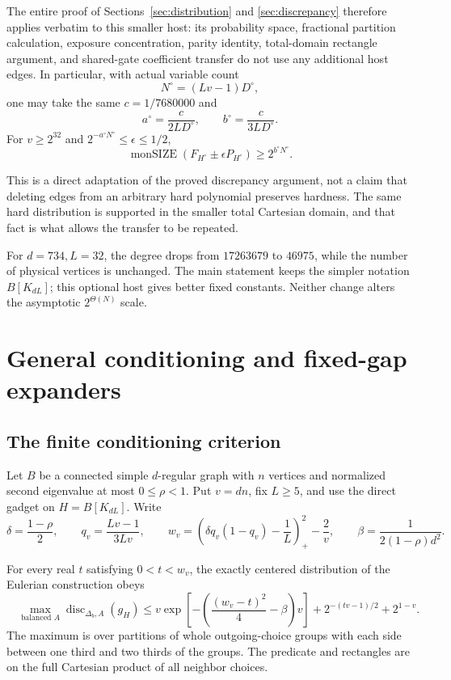 \documentclass[11pt]{article}
\theoremstyle{definition}
\theoremstyle{remark}
\numberwithin{equation}{section}
\begin{document}
The entire proof of Sections~\ref{sec:distribution} and \ref{sec:discrepancy} therefore applies
verbatim to this smaller host: its probability space, fractional
partition calculation, exposure concentration, parity identity,
total-domain rectangle argument, and shared-gate coefficient
transfer do not use any additional host edges. In particular,
with actual variable count
\[
                 N^\circ=(Lv-1)D^\circ,
\]
one may take the same \(c=1/7680000\) and
\[
 a^\circ=\frac{c}{2LD^\circ},\qquad
 b^\circ=\frac{c}{3LD^\circ}.
\]
For \(v\ge2^{32}\) and
\(2^{-a^\circ N^\circ}\le\epsilon\le1/2\),
\[
 \operatorname{monSIZE}
       (F_{H^\circ}\pm\epsilon P_{H^\circ})\ge2^{b^\circ N^\circ}.
\]

This is a direct adaptation of the proved discrepancy argument,
not a claim that deleting edges from an arbitrary hard polynomial
preserves hardness. The same hard distribution is supported in
the smaller total Cartesian domain, and that fact is what allows
the transfer to be repeated.

For \(d=734,L=32\), the degree drops from \(17263679\)
to \(46975\), while the number of physical vertices is unchanged.
The main statement keeps the simpler notation \(B[K_{dL}]\);
this optional host gives better fixed constants. Neither change
alters the asymptotic \(2^{\Theta(N)}\) scale.



\section{General conditioning and fixed-gap expanders}\label{app:general}
\subsection{The finite conditioning criterion}

Let \(B\) be a connected simple \(d\)-regular graph with \(n\)
vertices and normalized second eigenvalue at most
\(0\le\rho<1\). Put \(v=dn\), fix \(L\ge5\), and use
the direct gadget on \(H=B[K_{dL}]\). Write
\[
 \delta=\frac{1-\rho}{2},\qquad
 q_v=\frac{Lv-1}{3Lv},\qquad
 w_v=\left(\delta q_v(1-q_v)-\frac1L\right)_+^2-\frac2v,
 \qquad
 \beta=\frac1{2(1-\rho)d^2}.
\]

For every real \(t\) satisfying \(0<t<w_v\), the exactly
centered distribution of the Eulerian construction obeys
\begin{equation}\label{eq:G1}
\boxed{\quad
 \max_{\text{balanced }A}
    \operatorname{disc}_{\Delta_b,A}(g_H)
 \le
 v\exp\!\left[-\left(\frac{(w_v-t)^2}{4}-\beta\right)v\right]
       +2^{-(tv-1)/2}+2^{1-v}.
 \quad}
\end{equation}
The maximum is over partitions of whole outgoing-choice groups
with each side between one third and two thirds of the groups.
The predicate and rectangles are on the full Cartesian product
of all neighbor choices.
\end{document}

